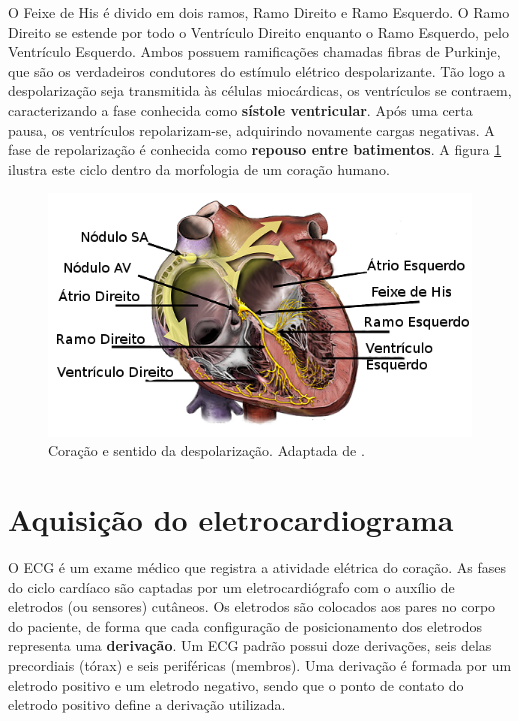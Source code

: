 O Feixe de His é divido em dois ramos, Ramo Direito e Ramo Esquerdo. O Ramo Direito se estende por todo o Ventrículo Direito enquanto o Ramo Esquerdo, pelo Ventrículo Esquerdo. Ambos possuem ramificações chamadas fibras de Purkinje, que são os verdadeiros condutores do estímulo elétrico despolarizante. Tão logo a despolarização seja transmitida às células miocárdicas, os ventrículos se contraem, caracterizando a fase conhecida como \textbf{sístole ventricular}. Após uma certa pausa, os ventrículos repolarizam-se, adquirindo novamente cargas negativas. A fase de repolarização é conhecida como \textbf{repouso entre batimentos}. A figura \ref{fig:heart} ilustra este ciclo dentro da morfologia de um coração humano.

\begin{figure}[ht!]
    \centering
    \includegraphics[width=400pt]{figures/chap2-heart.png}
    \caption[Coração e sentido da despolarização]{Coração e sentido da despolarização. Adaptada de \cite{blaufuss}.}
    \label{fig:heart}
\end{figure}

\section{Aquisição do eletrocardiograma}
O ECG é um exame médico que registra a atividade elétrica do coração. As fases do ciclo cardíaco são captadas por um eletrocardiógrafo com o auxílio de eletrodos (ou sensores) cutâneos. Os eletrodos são colocados aos pares no corpo do paciente, de forma que cada configuração de posicionamento dos eletrodos representa uma \textbf{derivação}. Um ECG padrão possui doze derivações, seis delas precordiais (tórax) e seis periféricas (membros). Uma derivação é formada por um eletrodo positivo e um eletrodo negativo, sendo que o ponto de contato do eletrodo positivo define a derivação utilizada.

